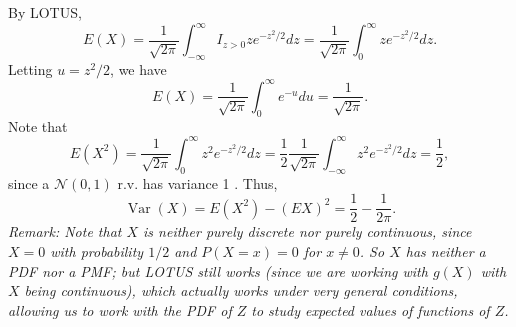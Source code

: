 

\setcounter{theorem}{33}
\begin{exercise}[BH.5.34]
\begin{solution}
    By LOTUS,
		$$
		E(X)=\frac{1}{\sqrt{2 \pi}} \int_{-\infty}^{\infty} I_{z>0} z e^{-z^2 / 2} d z=\frac{1}{\sqrt{2 \pi}} \int_0^{\infty} z e^{-z^2 / 2} d z .
		$$
		Letting $u=z^2 / 2$, we have
		$$
		E(X)=\frac{1}{\sqrt{2 \pi}} \int_0^{\infty} e^{-u} d u=\frac{1}{\sqrt{2 \pi}} .
		$$
		Note that
		$$
		E\left(X^2\right)=\frac{1}{\sqrt{2 \pi}} \int_0^{\infty} z^2 e^{-z^2 / 2} d z=\frac{1}{2} \frac{1}{\sqrt{2 \pi}} \int_{-\infty}^{\infty} z^2 e^{-z^2 / 2} d z=\frac{1}{2},
		$$
		since a $\mathcal{N}(0,1)$ r.v. has variance 1 . Thus, 
		$$
		\operatorname{Var}(X)=E\left(X^2\right)-(E X)^2=\frac{1}{2}-\frac{1}{2 \pi} .
		$$
		\textit{Remark:  Note that $X$ is neither purely discrete nor purely continuous, since $X=0$ with probability $1 / 2$ and $P(X=x)=0$ for $x \neq 0$. So $X$ has neither a PDF nor a PMF; but LOTUS still works (since we are working with $g(X)$ with $X$ being continuous), which actually works under very general conditions, allowing us to work with the PDF of $Z$ to study expected values of functions of $Z$.}
\end{solution}
\end{exercise}


